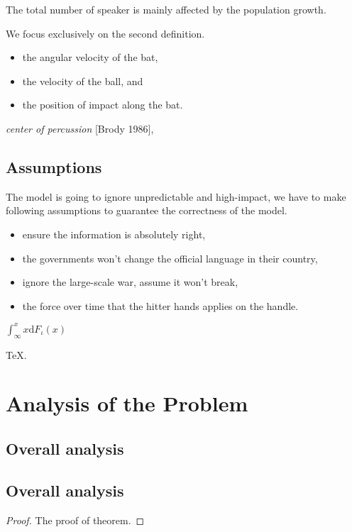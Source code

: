 \documentclass{mcmthesis}
\begin{document}
The total number of speaker is mainly affected by the population growth. 


We focus exclusively on the second definition.


\begin{itemize}
\item the angular velocity of the bat,
\item the velocity of the ball, and
\item the position of impact along the bat.
\end{itemize}

\emph{center of percussion} [Brody 1986], \lipsum[5]

\subsection{Assumptions}
\qquad The model is going to ignore unpredictable and high-impact, we have to make following assumptions to guarantee the correctness of the model.
\begin{itemize}
\item ensure the information is absolutely right, 
\item the governments won't change the official language in their country,
\item ignore the large-scale war, assume it won't break,
\item the force over time that the hitter hands applies on the handle.
\end{itemize}


\begin{Theorem} \label{thm:latex}
$\int^x_\infty x \mathrm{d}F_\iota(x)$
\end{Theorem}
\begin{Lemma} \label{thm:tex}
\TeX .
\end{Lemma}
\section{Analysis of the Problem}
\subsection{Overall analysis}

\subsection{Overall analysis}

\begin{proof}
The proof of theorem.
\end{proof}
\end{document}
